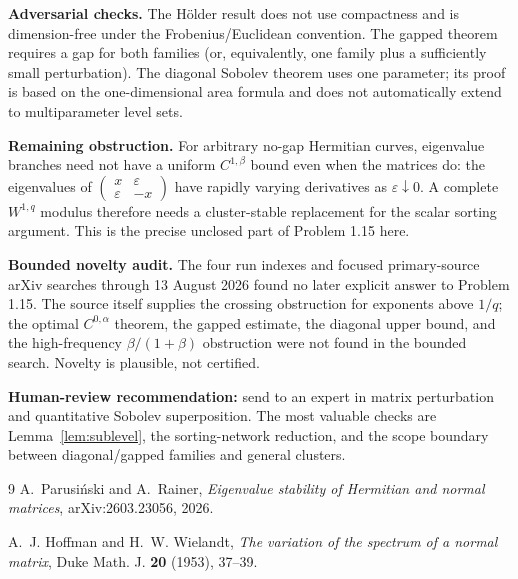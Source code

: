 \documentclass[10pt]{article}
\begin{document}
\textbf{Adversarial checks.}
The H\"older result does not use compactness and is dimension-free under the
Frobenius/Euclidean convention.  The gapped theorem requires a gap for both
families (or, equivalently, one family plus a sufficiently small
perturbation).  The diagonal Sobolev theorem uses one parameter; its proof is
based on the one-dimensional area formula and does not automatically extend
to multiparameter level sets.

\textbf{Remaining obstruction.}
For arbitrary no-gap Hermitian curves, eigenvalue branches need not have a
uniform $C^{1,\beta}$ bound even when the matrices do: the eigenvalues of
$\left(\begin{smallmatrix}x&\varepsilon\\\varepsilon&-x\end{smallmatrix}\right)$
have rapidly varying derivatives as $\varepsilon\downarrow0$.  A complete
$W^{1,q}$ modulus therefore needs a cluster-stable replacement for the scalar
sorting argument.  This is the precise unclosed part of Problem 1.15 here.

\textbf{Bounded novelty audit.}
The four run indexes and focused primary-source arXiv searches through
13 August 2026 found no later explicit answer to Problem 1.15.  The source
itself supplies the crossing obstruction for exponents above $1/q$; the
optimal $C^{0,\alpha}$ theorem, the gapped estimate, the diagonal upper bound,
and the high-frequency $\beta/(1+\beta)$ obstruction were not found in the
bounded search.  Novelty is plausible, not certified.

\textbf{Human-review recommendation:} send to an expert in matrix
perturbation and quantitative Sobolev superposition.  The most valuable
checks are Lemma~\ref{lem:sublevel}, the sorting-network reduction, and the
scope boundary between diagonal/gapped families and general clusters.

\begin{thebibliography}{9}
A.~Parusi\'nski and A.~Rainer,
\emph{Eigenvalue stability of Hermitian and normal matrices},
arXiv:2603.23056, 2026.

A.~J. Hoffman and H.~W. Wielandt,
\emph{The variation of the spectrum of a normal matrix},
Duke Math. J. \textbf{20} (1953), 37--39.
\end{thebibliography}
\end{document}
